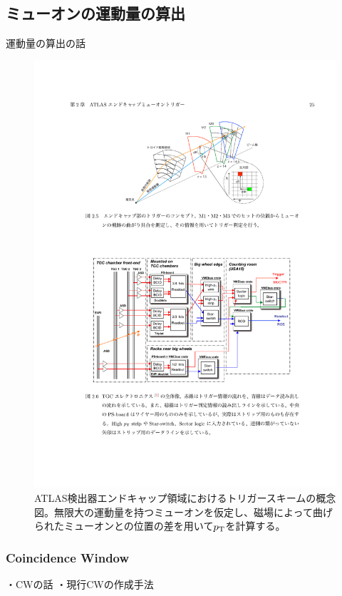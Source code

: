\subsection{ミューオンの運動量の算出}
運動量の算出の話
\begin{figure}[tb]
  \centering
  \includegraphics[clip, width=14cm]{fig/3/akatsuka_mt_trigger_scheme.pdf}
  \caption{ATLAS検出器エンドキャップ領域におけるトリガースキームの概念図\cite{article:akatsuka-mron}。無限大の運動量を持つミューオンを仮定し、磁場によって曲げられたミューオンとの位置の差を用いて$p_\mathrm{T}$を計算する。}
  \label{fig:trigger-scheme}
\end{figure}

\subsubsection{Coincidence Window}
・CWの話
・現行CWの作成手法

